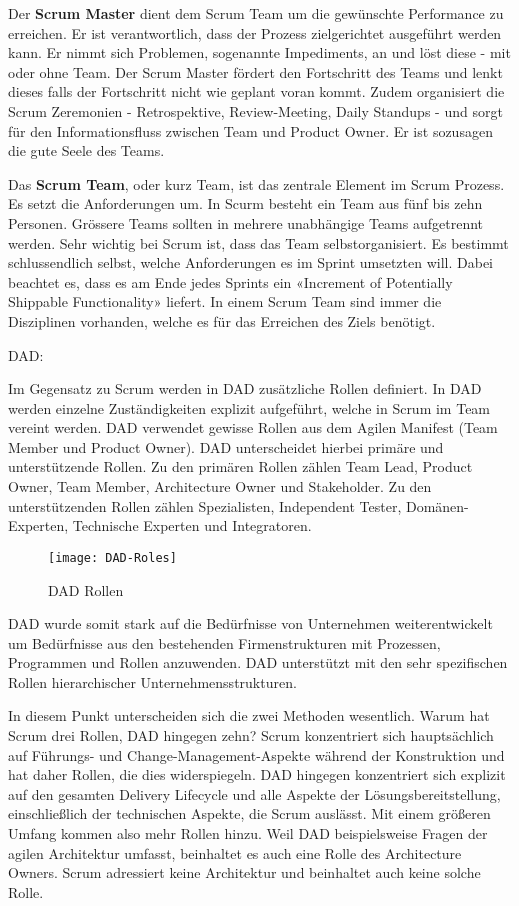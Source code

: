 Der \textbf{Scrum Master} dient dem Scrum Team um die gewünschte Performance zu erreichen. Er ist verantwortlich, dass der Prozess zielgerichtet ausgeführt werden kann. Er nimmt sich Problemen, sogenannte Impediments, an und löst diese - mit oder ohne Team. Der Scrum Master fördert den Fortschritt des Teams und lenkt dieses falls der Fortschritt nicht wie geplant voran kommt. Zudem organisiert die Scrum Zeremonien - Retrospektive, Review-Meeting, Daily Standups - und sorgt für den Informationsfluss zwischen Team und Product Owner. Er ist sozusagen die gute Seele des Teams. \medskip

Das \textbf{Scrum Team}, oder kurz Team, ist das zentrale Element im Scrum Prozess. Es setzt die Anforderungen um. In Scurm besteht ein Team aus fünf bis zehn Personen. Grössere Teams sollten in mehrere unabhängige Teams aufgetrennt werden. Sehr wichtig bei Scrum ist, dass das Team selbstorganisiert. Es bestimmt schlussendlich selbst, welche Anforderungen es im Sprint umsetzten will. Dabei beachtet es, dass es am Ende jedes Sprints ein «Increment of  Potentially Shippable Functionality» liefert. In einem Scrum Team sind immer die Disziplinen vorhanden, welche es für das Erreichen des Ziels benötigt.
\bigskip 

{\Large DAD:} \medskip

Im Gegensatz zu Scrum werden in DAD zusätzliche Rollen definiert. In DAD werden einzelne Zuständigkeiten explizit aufgeführt, welche in Scrum im Team vereint werden. DAD verwendet gewisse Rollen aus dem Agilen Manifest (Team Member und Product Owner). DAD unterscheidet hierbei primäre und unterstützende Rollen. Zu den primären Rollen zählen Team Lead, Product Owner, Team Member, Architecture Owner und Stakeholder. Zu den unterstützenden Rollen zählen Spezialisten, Independent Tester, Domänen-Experten, Technische Experten und Integratoren.
\begin{figure}[H]
	\centering
	\texttt{[image: DAD-Roles]}
	\caption{DAD Rollen}
	\label{fig:dadrollen}
\end{figure}

DAD wurde somit stark auf die Bedürfnisse von Unternehmen weiterentwickelt um Bedürfnisse aus den bestehenden Firmenstrukturen mit Prozessen, Programmen und Rollen anzuwenden. DAD unterstützt mit den sehr spezifischen Rollen hierarchischer Unternehmensstrukturen.
\bigskip 


In diesem Punkt unterscheiden sich die zwei Methoden wesentlich. Warum hat Scrum drei Rollen, DAD hingegen zehn? Scrum konzentriert sich hauptsächlich auf Führungs- und Change-Management-Aspekte während der Konstruktion und hat daher Rollen, die dies widerspiegeln. DAD hingegen konzentriert sich explizit auf den gesamten Delivery Lifecycle und alle Aspekte der Lösungsbereitstellung, einschließlich der technischen Aspekte, die Scrum auslässt. Mit einem größeren Umfang kommen also mehr Rollen hinzu. Weil DAD beispielsweise Fragen der agilen Architektur umfasst, beinhaltet es auch eine Rolle des Architecture Owners. Scrum adressiert keine Architektur und beinhaltet auch keine solche Rolle.

